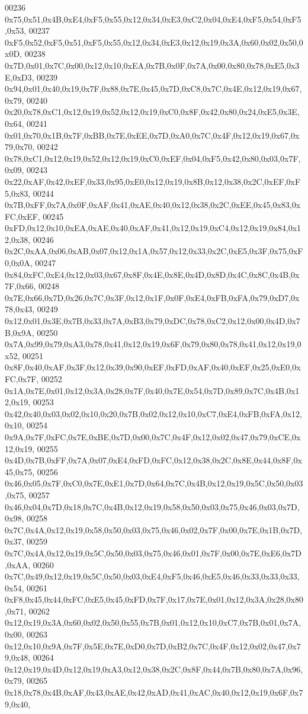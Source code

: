 \begin{DoxyCode}
00236 0x75,0x51,0x4B,0xE4,0xF5,0x55,0x12,0x34,0xE3,0xC2,0x04,0xE4,0xF5,0x54,0xF5,0x53,
00237 0xF5,0x52,0xF5,0x51,0xF5,0x55,0x12,0x34,0xE3,0x12,0x19,0x3A,0x60,0x02,0x50,0x0D,
00238 0x7D,0x01,0x7C,0x00,0x12,0x10,0xEA,0x7B,0x0F,0x7A,0x00,0x80,0x78,0xE5,0x3E,0xD3,
00239 0x94,0x01,0x40,0x19,0x7F,0x88,0x7E,0x45,0x7D,0xC8,0x7C,0x4E,0x12,0x19,0x67,0x79,
00240 0x20,0x78,0xC1,0x12,0x19,0x52,0x12,0x19,0xC0,0x8F,0x42,0x80,0x24,0xE5,0x3E,0x64,
00241 0x01,0x70,0x1B,0x7F,0xBB,0x7E,0xEE,0x7D,0xA0,0x7C,0x4F,0x12,0x19,0x67,0x79,0x70,
00242 0x78,0xC1,0x12,0x19,0x52,0x12,0x19,0xC0,0xEF,0x04,0xF5,0x42,0x80,0x03,0x7F,0x09,
00243 0x22,0xAF,0x42,0xEF,0x33,0x95,0xE0,0x12,0x19,0x8B,0x12,0x38,0x2C,0xEF,0xF5,0x83,
00244 0x7B,0xFF,0x7A,0x0F,0xAF,0x41,0xAE,0x40,0x12,0x38,0x2C,0xEE,0x45,0x83,0xFC,0xEF,
00245 0xFD,0x12,0x10,0xEA,0xAE,0x40,0xAF,0x41,0x12,0x19,0xC4,0x12,0x19,0x84,0x12,0x38,
00246 0x2C,0xAA,0x06,0xAB,0x07,0x12,0x1A,0x57,0x12,0x33,0x2C,0xE5,0x3F,0x75,0xF0,0x0A,
00247 0x84,0xFC,0xE4,0x12,0x03,0x67,0x8F,0x4E,0x8E,0x4D,0x8D,0x4C,0x8C,0x4B,0x7F,0x66,
00248 0x7E,0x66,0x7D,0x26,0x7C,0x3F,0x12,0x1F,0x0F,0xE4,0xFB,0xFA,0x79,0xD7,0x78,0x43,
00249 0x12,0x01,0x3E,0x7B,0x33,0x7A,0xB3,0x79,0xDC,0x78,0xC2,0x12,0x00,0x4D,0x7B,0x9A,
00250 0x7A,0x99,0x79,0xA3,0x78,0x41,0x12,0x19,0x6F,0x79,0x80,0x78,0x41,0x12,0x19,0x52,
00251 0x8F,0x40,0xAF,0x3F,0x12,0x39,0x90,0xEF,0xFD,0xAF,0x40,0xEF,0x25,0xE0,0xFC,0x7F,
00252 0x1A,0x7E,0x01,0x12,0x3A,0x28,0x7F,0x40,0x7E,0x54,0x7D,0x89,0x7C,0x4B,0x12,0x19,
00253 0x42,0x40,0x03,0x02,0x10,0x20,0x7B,0x02,0x12,0x10,0xC7,0xE4,0xFB,0xFA,0x12,0x10,
00254 0x9A,0x7F,0xFC,0x7E,0xBE,0x7D,0x00,0x7C,0x4F,0x12,0x02,0x47,0x79,0xCE,0x12,0x19,
00255 0x4D,0x7B,0xFF,0x7A,0x07,0xE4,0xFD,0xFC,0x12,0x38,0x2C,0x8E,0x44,0x8F,0x45,0x75,
00256 0x46,0x05,0x7F,0xC0,0x7E,0xE1,0x7D,0x64,0x7C,0x4B,0x12,0x19,0x5C,0x50,0x03,0x75,
00257 0x46,0x04,0x7D,0x18,0x7C,0x4B,0x12,0x19,0x58,0x50,0x03,0x75,0x46,0x03,0x7D,0x98,
00258 0x7C,0x4A,0x12,0x19,0x58,0x50,0x03,0x75,0x46,0x02,0x7F,0x00,0x7E,0x1B,0x7D,0x37,
00259 0x7C,0x4A,0x12,0x19,0x5C,0x50,0x03,0x75,0x46,0x01,0x7F,0x00,0x7E,0xE6,0x7D,0xAA,
00260 0x7C,0x49,0x12,0x19,0x5C,0x50,0x03,0xE4,0xF5,0x46,0xE5,0x46,0x33,0x33,0x33,0x54,
00261 0xF8,0x45,0x44,0xFC,0xE5,0x45,0xFD,0x7F,0x17,0x7E,0x01,0x12,0x3A,0x28,0x80,0x71,
00262 0x12,0x19,0x3A,0x60,0x02,0x50,0x55,0x7B,0x01,0x12,0x10,0xC7,0x7B,0x01,0x7A,0x00,
00263 0x12,0x10,0x9A,0x7F,0x5E,0x7E,0xD0,0x7D,0xB2,0x7C,0x4F,0x12,0x02,0x47,0x79,0x48,
00264 0x12,0x19,0x4D,0x12,0x19,0xA3,0x12,0x38,0x2C,0x8F,0x44,0x7B,0x80,0x7A,0x96,0x79,
00265 0x18,0x78,0x4B,0xAF,0x43,0xAE,0x42,0xAD,0x41,0xAC,0x40,0x12,0x19,0x6F,0x79,0x40,

\end{DoxyCode}
